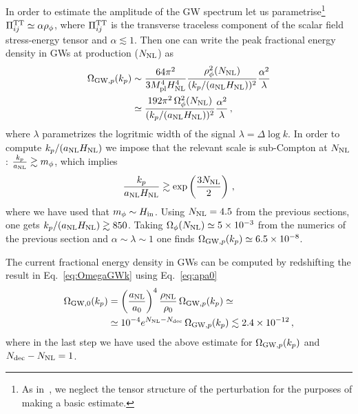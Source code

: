 \documentclass[a4paper, amsfonts, amssymb, amsmath, reprint, showkeys, nofootinbib, twoside, superscriptaddress]{revtex4-1}
\def\mpl{M_{\rm pl}}
\def\mpl{M_{\rm pl}}
\begin{document}
In order to estimate the amplitude of the GW spectrum let us parametrise\footnote{As in~\cite{Chatrchyan:2020pzh}, we neglect the tensor structure of the perturbation for the purposes of making a basic estimate.} $\Pi^{\rm TT}_{ij} \simeq \alpha \rho_\phi$, where $\Pi^{\rm TT}_{ij}$ is the transverse traceless component of the scalar field stress-energy tensor and $\alpha \lesssim 1$. Then one can write the peak fractional energy density in GWs at production ($N_{\rm NL}$) as~\cite{Chatrchyan:2020pzh}
\begin{align}
\label{eq:OmegaGWk}
\Omega_{{\rm GW}, p}(k_p) &\sim \frac{64 \pi^2}{3 \mpl^4 H_{\rm NL}^4} \frac{\rho_{\phi}^2(N_{\rm NL})}{(k_p/(a_{\rm NL} H_{\rm NL}))^2} \frac{\alpha^2}{\lambda} \nonumber \\
& \simeq \frac{192 \pi^2 \, \Omega_\phi^2(N_{\rm NL})}{(k_p/(a_{\rm NL} H_{\rm NL}))^2} \frac{\alpha^2}{\lambda} \,,
\end{align}
where $\lambda$ parametrizes the logritmic width of the signal $\lambda = \Delta \log k$. 
In order to compute $k_p/(a_{\rm NL} H_{\rm NL})$ we impose that the relevant scale is sub-Compton at $N_{\rm NL}$: $\frac{k_p}{a_{\rm NL}} \gtrsim m_\phi$, which implies
\begin{equation}
\frac{k_p}{a_{\rm NL} H_{\rm NL}} \gtrsim \exp\left(\frac{3 N_{\rm NL}}{2}\right) \,,
\end{equation}
where we have used that $m_\phi \sim H_{\rm in}$. Using $N_{\rm NL}= 4.5$ from the previous sections, one gets $k_p/(a_{\rm NL} H_{\rm NL}) \gtrsim 850$. Taking $\Omega_\phi(N_{\rm NL}) \simeq5 \times 10^{-3}$ from the numerics of the previous section and $\alpha \sim \lambda \sim 1$ one finds $\Omega_{{\rm GW}, p}(k_p) \simeq 6.5 \times 10^{-8}$.

The current fractional energy density in GWs can be computed by redshifting the result in Eq.~\eqref{eq:OmegaGWk} using Eq.~\eqref{eq:apa0}
\begin{align}
\Omega_{\rm GW, 0} (k_p) &= \left(\frac{a_{\rm NL}}{a_0}\right)^4 \frac{\rho_{\rm NL}}{\rho_0} \, \Omega_{{\rm GW}, p} (k_p) \simeq \\
& \simeq 10^{-4} e^{N_{\rm NL} - N_{\rm dec}} \, \Omega_{{\rm GW}, p}(k_p) \lesssim 2.4 \times 10^{-12} \,, \nonumber
\end{align}
where in the last step we have used the above estimate for $\Omega_{{\rm GW},p}(k_p)$ and $N_{\rm dec} - N_{\rm NL} = 1$.\\
\end{document}
